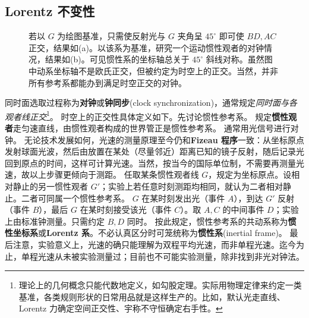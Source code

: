 \subsection{Lorentz 不变性}

\begin{figure}[ht]
    \centering
    \qquad
    \caption{\small 若以 $G$ 为绘图基准，只需使反射光与 $G$ 夹角呈 $45^\circ$ 即可使 $BD,AC$ 正交，结果如(a)。以该系为基准，研究一个运动惯性观者的对钟情况，结果如(b)。可见惯性系的坐标轴总关于 $45^\circ$ 斜线对称。虽然图中动系坐标轴不是欧氏正交，但被约定为时空上的正交。当然，并非所有参考系都能办到满足时空正交的对钟。}
    \label{fig:clock_syn}
\end{figure}

同时面选取过程称为\textbf{对钟}或\textbf{钟同步}(clock synchronization)，通常规定\textit{同时面与各观者线正交}\footnote{理论上的几何概念只能代数地定义，如勾股定理。实际用物理定律来约定一类基准，各类规则形状的日常用品就是这样生产的。比如，默认光走直线、Lorentz 力确定空间正交性、宇称不守恒确定右手性。}。
时空上的正交性具体定义如下。先讨论惯性参考系。
规定\textbf{惯性观者}走匀速直线，由惯性观者构成的世界管正是惯性参考系。
通常用光信号进行对钟。
无论技术发展如何，光速的测量原理至今仍和\textbf{Fizeau 程序}一致：从坐标原点发射球面光波，然后由放置在某处（尽量邻近）距离已知的镜子反射，随后记录光回到原点的时间，这样可计算光速。当然，按当今的国际单位制，不需要再测量光速，故以上步骤更倾向于测距。
任取某条惯性观者线 $G$，规定为坐标原点。设相对静止的另一惯性观者 $G'$；实验上若任意时刻测距均相同，就认为二者相对静止。二者可同属一个惯性参考系。
$G$ 在某时刻发出光（事件 $A$），到达 $G'$ 反射（事件 $B$），最后 $G$ 在某时刻接受该光（事件 $C$）。取 $A,C$ 的中间事件 $D$；实验上由标准钟测量。只需约定 $B,D$ 同时。
按此规定，惯性参考系的共动系称为\textbf{惯性坐标系}或\textbf{Lorentz 系}。不必认真区分时可笼统称为\textbf{惯性系}(inertial frame)。
最后注意，实验意义上，光速的确只能理解为双程平均光速，而非单程光速。迄今为止，单程光速从未被实验测量过；目前也不可能实验测量，除非找到非光对钟法。

